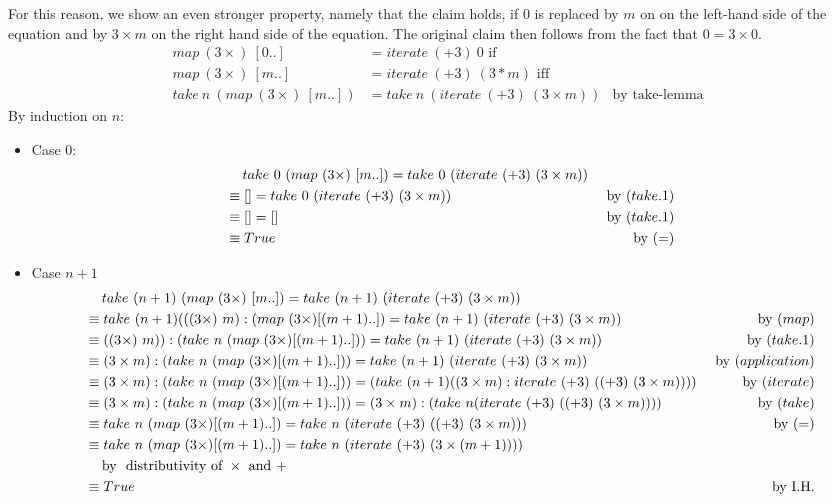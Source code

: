 \documentclass{article}[10pt]
\begin{document}
    For this reason, we show an even stronger property, namely that
    the claim holds, if $0$ is replaced by $m$ on on the left-hand side of the equation and by $3 \times m$
    on the right hand side of the equation. The original claim then follows from the fact that $0 = 3 \times 0$.
    \begin{align*}
      map\ (3 \times)\ [0 .. ] &= iterate\ (+3)\ 0 \text{ if }\\
      map\ (3 \times)\ [m..] &= iterate\ (+3)\ (3*m) \text{ iff }\\
      take\ n\ (map\ (3 \times)\ [m..]) &= take\ n\ (iterate\ (+3)\ (3 \times m)) &\text{by take-lemma}
    \end{align*}
    By induction on $n$:
    \begin{itemize}
      \item Case $0$:
      \begin{align*}
        &\mathbin{\hphantom{\equiv}}take\ 0\ (map\ (3 \times)\ [m..]) = take\ 0\ (iterate\ (+3)\ (3 \times m))\\
        &\equiv []                                                    = take\ 0\ (iterate\ (+3)\ (3 \times m)) &\text{ by }(take.1)\\
        &\equiv []                                                    = []                          &\text{ by }(take.1)\\
        &\equiv True &\text{ by }(=)\\
      \end{align*}
      \item Case $n+1$
      \begin{align*}
        &\mathbin{\hphantom{\equiv}}take\ (n+1)\ (map\ (3 \times)\ [m..]) = take\ (n+1)\ (iterate\ (+3)\ (3 \times m))\\
        &\equiv take\ (n+1) (((3 \times)\ m) : (map\ (3 \times) [(m+1)..]) =  take\ (n+1)\ (iterate\ (+3)\ (3 \times m)) &\text{ by }(map)\\
        &\equiv ((3 \times)\ m)) : (take\ n\ (map\ (3 \times) [(m+1)..])) = take\ (n+1)\ (iterate\ (+3)\ (3 \times m)) &\text{ by }(take.1)\\
        &\equiv (3 \times m) : (take\ n\ (map\ (3 \times) [(m+1)..])) = take\ (n+1)\ (iterate\ (+3)\ (3 \times m)) &\text{ by }(application)\\
        &\equiv (3 \times m) : (take\ n\ (map\ (3 \times) [(m+1)..])) = (take\ (n+1) ((3 \times m) : iterate\ (+3)\ ((+3)\ (3 \times m)))) &\text{ by }(iterate)\\
        &\equiv (3 \times m) : (take\ n\ (map\ (3 \times) [(m+1)..])) = (3 \times m) : (take\ n (iterate\ (+3)\ ((+3)\ (3 \times m)))) &\text{ by }(take)\\
        &\equiv take\ n\ (map\ (3 \times) [(m+1)..]) = take\ n\ (iterate\ (+3)\ ((+3)\ (3 \times m))) &\text{ by }(=)\\
        &\equiv take\ n\ (map\ (3 \times) [(m+1)..]) = take\ n\ (iterate\ (+3)\ (3 \times (m+1))))\\
        &\mathbin{\hphantom{=}}\text{by } \text{ distributivity of } \times \text{ and } +\\
        &\equiv True &\text{by I.H.}
      \end{align*}
    \end{itemize}
\end{document}
